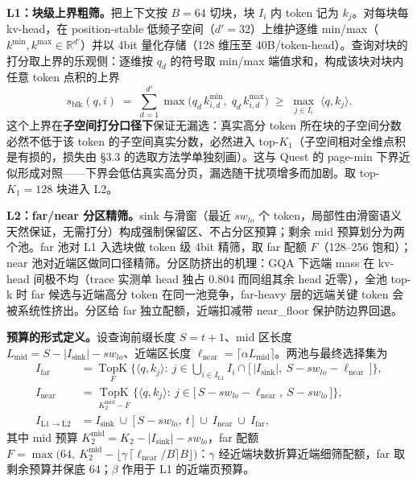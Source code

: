 \documentclass[11pt]{article}
\begin{document}
\textbf{L1：块级上界粗筛。}把上下文按 $B{=}64$ 切块，块 $I_i$ 内 token 记为 $k_j$。对每块每 kv-head，在 position-stable 低频子空间（$d'{=}32$）上维护逐维 min/max（$k^{\min}, k^{\max}\in\mathbb{R}^{d'}$）并以 4bit 量化存储（128 维压至 40B/token-head）。查询对块的打分取上界的乐观侧：逐维按 $q_d$ 的符号取 min/max 端值求和，构成该块对块内任意 token 点积的上界
\begin{equation}
s_{\mathrm{blk}}(q, i) \;=\; \sum_{d=1}^{d'} \max\!\big(q_d\, k^{\min}_{i,d},\; q_d\, k^{\max}_{i,d}\big)\;\geq\; \max_{j\in I_i}\; \langle q, k_j \rangle.
\end{equation}
这个上界在\textbf{子空间打分口径下}保证无漏选：真实高分 token 所在块的子空间分数必然不低于该 token 的子空间真实分数，必然进入 top-$K_1$（子空间相对全维点积是有损的，损失由 §3.3 的选取方法学单独刻画）。这与 Quest 的 page-min 下界近似形成对照——下界会低估真实高分页，漏选随干扰项增多而加剧。取 top-$K_1{=}128$ 块进入 L2。

\textbf{L2：far/near 分区精筛。}sink 与滑窗（最近 $sw_{lo}$ 个 token，局部性由滑窗语义天然保证，无需打分）构成强制保留区、不占分区预算；剩余 mid 预算划分为两个池。far 池对 L1 入选块做 token 级 4bit 精筛，取 far 配额 $F$（128--256 饱和）；near 池对近端区做同口径精筛。分区防挤出的机理：GQA 下远端 mass 在 kv-head 间极不均（trace 实测单 head 独占 0.804 而同组其余 head 近零），全池 top-k 时 far 候选与近端高分 token 在同一池竞争，far-heavy 层的远端关键 token 会被系统性挤出。分区给 far 独立配额，近端扣减带 near\_floor 保护防边界回退。

\textbf{预算的形式定义。}设查询前缀长度 $S=t+1$、mid 区长度 $L_{\mathrm{mid}}=S-|I_{\mathrm{sink}}|-sw_{lo}$、近端区长度 $\ell_{\mathrm{near}}=\lceil\alpha L_{\mathrm{mid}}\rceil$。两池与最终选择集为
\begin{align}
I_{\mathrm{far}} &= \operatorname*{TopK}_{F}\Big\{\langle q,k_j\rangle:\ j\in\bigcup\nolimits_{i\in I_{\mathrm{L1}}} I_i\cap\big[\,|I_{\mathrm{sink}}|,\ S-sw_{lo}-\ell_{\mathrm{near}}\,\big]\Big\},\\
I_{\mathrm{near}} &= \operatorname*{TopK}_{K_2^{\mathrm{mid}}-F}\Big\{\langle q,k_j\rangle:\ j\in\big[\,S-sw_{lo}-\ell_{\mathrm{near}},\ S-sw_{lo}\,\big]\Big\},\\
I_{\mathrm{L1}\rightarrow\mathrm{L2}} &= I_{\mathrm{sink}}\ \cup\ \big[\,S-sw_{lo},\ t\,\big]\ \cup\ I_{\mathrm{near}}\ \cup\ I_{\mathrm{far}},
\end{align}
其中 mid 预算 $K_2^{\mathrm{mid}}=K_2-|I_{\mathrm{sink}}|-sw_{lo}$，far 配额 $F=\max\big(64,\ K_2^{\mathrm{mid}}-\lfloor\gamma\,\lceil\ell_{\mathrm{near}}/B\rceil B\rfloor\big)$：$\gamma$ 经近端块数折算近端细筛配额，far 取剩余预算并保底 64；$\beta$ 作用于 L1 的近端页预算。
\end{document}

